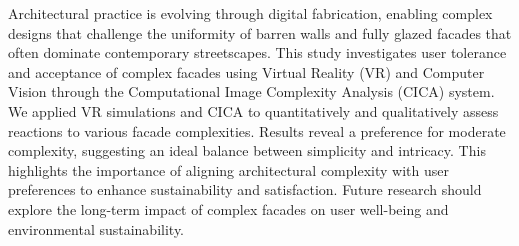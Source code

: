 




Architectural practice is evolving through digital fabrication, enabling complex designs that challenge the uniformity of barren walls and fully glazed facades that often dominate contemporary streetscapes.
This study investigates user tolerance and acceptance of complex facades using Virtual Reality (VR) and Computer Vision through the Computational Image Complexity Analysis (CICA) system.
We applied VR simulations and CICA to quantitatively and qualitatively assess reactions to various facade complexities.
Results reveal a preference for moderate complexity, suggesting an ideal balance between simplicity and intricacy.
This highlights the importance of aligning architectural complexity with user preferences to enhance sustainability and satisfaction.
Future research should explore the long-term impact of complex facades on user well-being and environmental sustainability.



